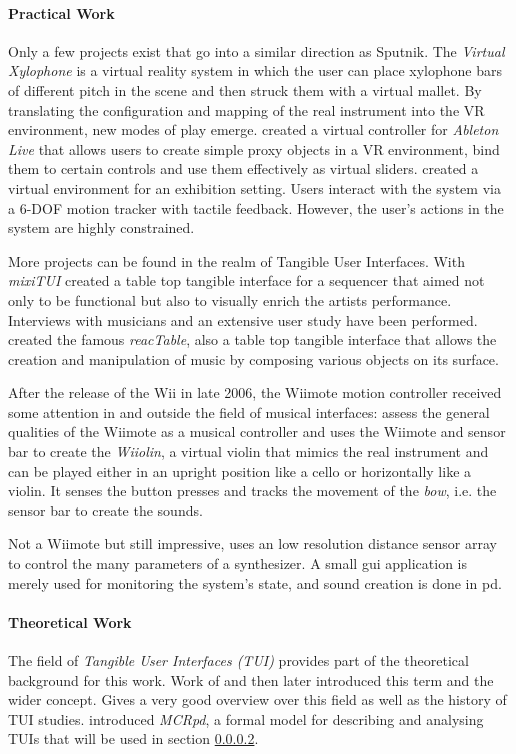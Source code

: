 \documentclass[10pt,a4paper]{scrartcl}
\begin{document}
\paragraph{Practical Work}
Only a few projects exist that go into a similar direction as Sputnik. The \emph{Virtual Xylophone}\cite{Maki-Patola2005} is a virtual reality system in which the user can place xylophone bars of different pitch in the scene and then struck them with a virtual mallet. By translating the configuration and mapping of the real instrument into the VR environment, new modes of play emerge.
\cite{Zappi2010} created a virtual controller for \emph{Ableton Live} that allows users to create simple proxy objects in a VR environment, bind them to certain controls and use them effectively as virtual sliders. \cite{Rodet2005} created a virtual environment for an exhibition setting. Users interact with the system via a 6-DOF motion tracker with tactile feedback. However, the user's actions in the system are highly constrained.

More projects can be found in the realm of Tangible User Interfaces. With \emph{mixiTUI} \cite{Pedersen2009} created a table top tangible interface for a sequencer that aimed not only to be functional but also to visually enrich the artists performance. Interviews with musicians and an extensive user study have been performed. \cite{Jorda2007} created the famous \emph{reacTable}, also a table top tangible interface that allows the creation and manipulation of music by composing various objects on its surface. 

After the release of the Wii in late 2006, the Wiimote motion controller received some attention in and outside the field of musical interfaces: 
\cite{Kiefer2008} assess the general qualities of the Wiimote as a musical controller and \cite{Miller2010} uses the Wiimote and sensor bar to create the \emph{Wiiolin}, a virtual violin that mimics the real instrument and can be played either in an upright position like a cello or horizontally like a violin. It senses the button presses and tracks the movement of the \emph{bow}, i.e. the sensor bar to create the sounds.

Not a Wiimote but still impressive, \cite{Miyama2010} uses an low resolution distance sensor array to control the many parameters of a synthesizer. A small gui application is merely used for monitoring the system's state, and sound creation is done in pd.


\paragraph{Theoretical Work}
The field of \emph{Tangible User Interfaces (TUI)} provides part of the theoretical background for this work. Work of \cite{Fitzmaurice1995} and then later \cite{Ishii1997} introduced this term and the wider concept. \cite{Shaer2009} Gives a very good overview over this field as well as the history of TUI studies. \cite{Ullmer2000} introduced \emph{MCRpd}, a formal model for describing and analysing TUIs that will be used in section \ref{}.
\end{document}
